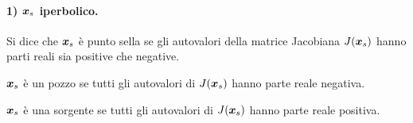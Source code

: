 \paragraph{1) $\boldsymbol{x}_s$ iperbolico.}%
\begin{defn}
    Si dice che $\boldsymbol{x}_s$ è punto sella se gli autovalori della matrice Jacobiana $J(\boldsymbol{x}_s)$ hanno parti reali sia positive che negative.
\end{defn}
\noindent
\begin{defn}[Pozzo]
    $\boldsymbol{x}_s$ è un pozzo se tutti gli autovalori di $J(\boldsymbol{x}_s)$ hanno parte reale negativa.
\end{defn}
\noindent
\begin{defn}[Sorgente]
    $\boldsymbol{x}_s$ è una sorgente se tutti gli autovalori di $J(\boldsymbol{x}_s)$ hanno parte reale positiva.
\end{defn}
\noindent
